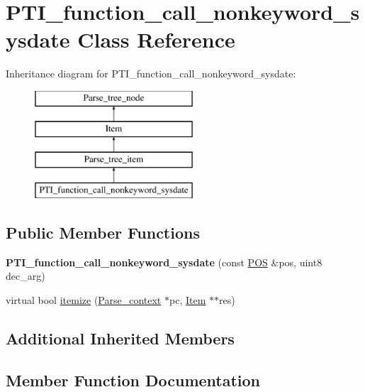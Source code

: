 \hypertarget{classPTI__function__call__nonkeyword__sysdate}{}\section{P\+T\+I\+\_\+function\+\_\+call\+\_\+nonkeyword\+\_\+sysdate Class Reference}
\label{classPTI__function__call__nonkeyword__sysdate}
Inheritance diagram for P\+T\+I\+\_\+function\+\_\+call\+\_\+nonkeyword\+\_\+sysdate\+:\begin{figure}[H]
\begin{center}
\leavevmode
\includegraphics[height=4.000000cm]{classPTI__function__call__nonkeyword__sysdate}
\end{center}
\end{figure}
\subsection*{Public Member Functions}
\begin{DoxyCompactItemize}
\item 
\mbox{\label{classPTI__function__call__nonkeyword__sysdate_ada0411f54f782f7318b16962900a499b}} 
{\bfseries P\+T\+I\+\_\+function\+\_\+call\+\_\+nonkeyword\+\_\+sysdate} (const \mbox{\hyperlink{structYYLTYPE}{P\+OS}} \&pos, uint8 dec\+\_\+arg)
\item 
virtual bool \mbox{\hyperlink{classPTI__function__call__nonkeyword__sysdate_a472d886c3a71afb25b2ff7b482871ee7}{itemize}} (\mbox{\hyperlink{structParse__context}{Parse\+\_\+context}} $\ast$pc, \mbox{\hyperlink{classItem}{Item}} $\ast$$\ast$res)
\end{DoxyCompactItemize}
\subsection*{Additional Inherited Members}


\subsection{Member Function Documentation}
\mbox{\label{classPTI__function__call__nonkeyword__sysdate_a472d886c3a71afb25b2ff7b482871ee7}} 
